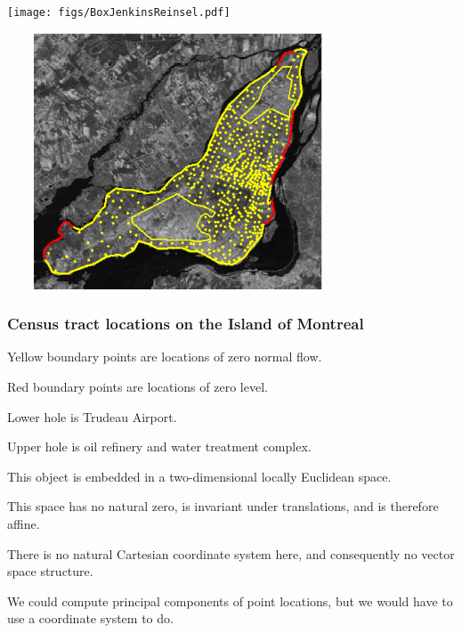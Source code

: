 \documentclass[11pt]{beamer}
\begin{document}

\begin{frame}

\begin{center}
\texttt{[image: figs/BoxJenkinsReinsel.pdf]}
\end{center}

\end{frame}




\begin{frame}

\begin{center}
\includegraphics[height=3in, width=4in]{figs/Montreal_data_boundary_small.eps}
\end{center}

\end{frame}


\begin{frame}

\frametitle{Census tract locations on the Island of Montreal}

\bi
  \item Yellow boundary points are locations of zero normal flow.
  \item Red boundary points are locations of zero level.
  \item Lower hole is Trudeau Airport.
  \item Upper hole is oil refinery and water treatment complex.
  \item This object is embedded in a two-dimensional locally Euclidean space.
  \item This space has no natural zero, is invariant under translations, and is therefore affine.
  \item There is no natural Cartesian coordinate system here, and consequently no vector space structure.
  \item We could compute principal components of point locations, but we would have to use a coordinate system to do.
\ei

\end{frame}
\end{document}
